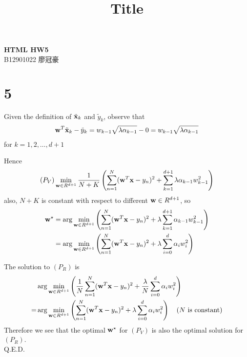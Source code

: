 \documentclass[11pt]{article}
\let\mathbb\relax
\theoremstyle{definition}
\begin{document}
\setcounter{section}{0}
\title{Title}

\thispagestyle{empty}
\begin{center}
  {\large \bf HTML HW5} \\ 
  B12901022 廖冠豪
\end{center}
\section*{5}
Given the definition of $\tilde{\vb{x}}_k$ and $\tilde{y}_k$, observe that
\[
  \vb{w}^T\tilde{\vb{x}}_k - \tilde{y}_k = w_{k - 1}\sqrt{\lambda\alpha_{k - 1}} - 0 = w_{k - 1}\sqrt{\lambda\alpha_{k - 1}}
\]
for $k = 1,2, \dots, d + 1$ \\ 
\par
Hence
\[
  (P_V)\min_{\vb{w}\in\mathbb{R}^{d + 1}}\frac{1}{N + K}\left(\sum^N_{n = 1}(\vb{w}^T\vb{x} - y_n)^2 + \sum^{d + 1}_{k = 1}\lambda\alpha_{k - 1}w^2_{k - 1}\right)
\]
also, $N + K$ is constant with respect to different $\vb{w}\in\mathbb{R}^{d + 1}$, so
\begin{align*}
  \vb{w}^\star &= \arg\min_{\vb{w}\in\mathbb{R}^{d + 1}}\left(\sum^N_{n = 1}(\vb{w}^T\vb{x} - y_n)^2 + \lambda\sum^{d + 1}_{k = 1}\alpha_{k - 1}w^2_{k - 1}\right) \\ 
  &= \arg\min_{\vb{w}\in\mathbb{R}^{d + 1}}\left(\sum^N_{n = 1}(\vb{w}^T\vb{x} - y_n)^2 + \lambda\sum^{d}_{i = 0}\alpha_{i}w^2_{i}\right) \\ 
\end{align*}
\par 
The solution to $(P_R)$ is 
\begin{align*}
  &\arg\min_{\vb{w}\in\mathbb{R}^{d + 1}}\left(\frac{1}{N}\sum^N_{n = 1}(\vb{w}^T\vb{x} - y_n)^2 + \frac{\lambda}{N}\sum^{d}_{i = 0}\alpha_{i}w^2_{i}\right) \\ 
  = &\arg\min_{\vb{w}\in\mathbb{R}^{d + 1}}\left(\sum^N_{n = 1}(\vb{w}^T\vb{x} - y_n)^2 + \lambda\sum^{d}_{i = 0}\alpha_{i}w^2_{i}\right)\quad(\text{$N$ is constant})
\end{align*}
Therefore we see that the optimal $\vb{w}^\star$ for $(P_V)$ is also the optimal solution for $(P_R)$. \\ 
Q.E.D.
\newpage 
\end{document}
